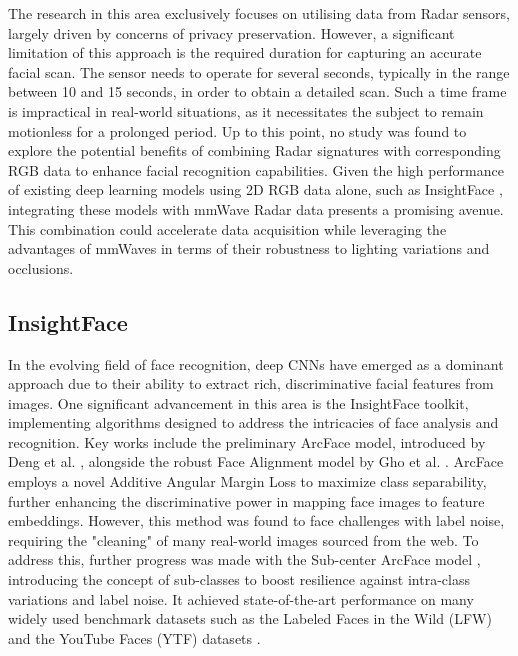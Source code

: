 \documentclass{interim}
\begin{document}
The research in this area exclusively focuses on utilising data from Radar sensors, largely driven by concerns of privacy preservation. However, a significant limitation of this approach is the required duration for capturing an accurate facial scan. The sensor needs to operate for several seconds, typically in the range between 10 and 15 seconds, in order to obtain a detailed scan. Such a time frame is impractical in real-world situations, as it necessitates the subject to remain motionless for a prolonged period. Up to this point, no study was found to explore the potential benefits of combining Radar signatures with corresponding RGB data to enhance facial recognition capabilities. Given the high performance of existing deep learning models using 2D RGB data alone, such as InsightFace \cite{deng2018arcface}, integrating these models with mmWave Radar data presents a promising avenue. This combination could accelerate data acquisition while leveraging the advantages of mmWaves in terms of their robustness to lighting variations and occlusions.


\subsection{InsightFace}
\label{background:insightface}
In the evolving field of face recognition, deep CNNs have emerged as a dominant approach due to their ability to extract rich, discriminative facial features from images. One significant advancement in this area is the InsightFace toolkit, implementing algorithms designed to address the intricacies of face analysis and recognition. Key works include the preliminary ArcFace model, introduced by Deng et al. \cite{deng2018arcface}, alongside the robust Face Alignment model by Gho et al. \cite{guo2018stacked}. ArcFace employs a novel Additive Angular Margin Loss to maximize class separability, further enhancing the discriminative power in mapping face images to feature embeddings. However, this method was found to face challenges with label noise, requiring the "cleaning" of many real-world images sourced from the web. To address this, further progress was made with the Sub-center ArcFace model \cite{deng2020subcenter}, introducing the concept of sub-classes to boost resilience against intra-class variations and label noise. It achieved state-of-the-art performance on many widely used benchmark datasets such as the Labeled Faces in the Wild (LFW) \cite{huang2008labeled} and the YouTube Faces (YTF) datasets \cite{wolf2011face}.
\end{document}
